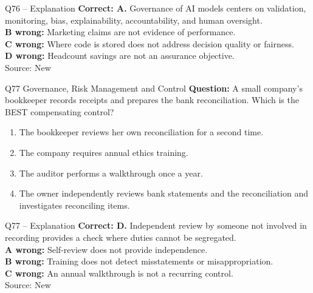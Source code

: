 \documentclass[aspectratio=169,10pt]{beamer}
\begin{document}
\begin{frame}[t]{Q76 -- Explanation}
	\footnotesize
	\textbf{Correct: A.} Governance of AI models centers on validation, monitoring, bias, explainability, accountability, and human oversight. \\[5pt]
\textbf{B wrong:} Marketing claims are not evidence of performance. \\[3pt]
\textbf{C wrong:} Where code is stored does not address decision quality or fairness. \\[3pt]
\textbf{D wrong:} Headcount savings are not an assurance objective. \\[3pt]
	\vfill {\tiny Source: New}
\end{frame}

\begin{frame}[t]{Q77 \hfill {\scriptsize Governance, Risk Management and Control}}
	\small
	\textbf{Question:} A small company's bookkeeper records receipts and prepares the bank reconciliation. Which is the BEST compensating control?
	\begin{enumerate}[label=\Alph*.,itemsep=1pt,topsep=3pt]
			\item The bookkeeper reviews her own reconciliation for a second time.
			\item The company requires annual ethics training.
			\item The auditor performs a walkthrough once a year.
			\item The owner independently reviews bank statements and the reconciliation and investigates reconciling items.
	\end{enumerate}
\end{frame}

\begin{frame}[t]{Q77 -- Explanation}
	\footnotesize
	\textbf{Correct: D.} Independent review by someone not involved in recording provides a check where duties cannot be segregated. \\[5pt]
\textbf{A wrong:} Self-review does not provide independence. \\[3pt]
\textbf{B wrong:} Training does not detect misstatements or misappropriation. \\[3pt]
\textbf{C wrong:} An annual walkthrough is not a recurring control. \\[3pt]
	\vfill {\tiny Source: New}
\end{frame}
\end{document}
